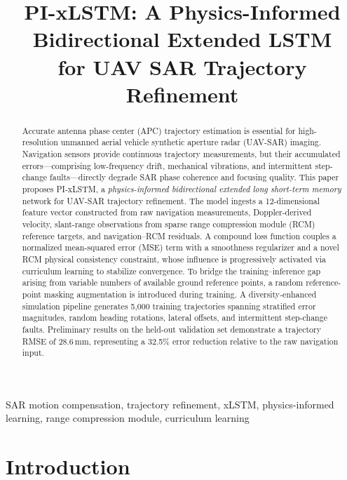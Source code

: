 \documentclass[conference]{IEEEtran}
\title{PI-xLSTM: A Physics-Informed Bidirectional Extended LSTM\\
for UAV SAR Trajectory Refinement}
\author{
  \IEEEauthorblockN{[Author Names Anonymized for Review]}
  \IEEEauthorblockA{[Affiliation]}
}
\begin{document}
\maketitle

\begin{abstract}
Accurate antenna phase center (APC) trajectory estimation is essential for high-resolution
unmanned aerial vehicle synthetic aperture radar (UAV-SAR) imaging.
Navigation sensors provide continuous trajectory measurements,
but their accumulated errors—comprising low-frequency drift,
mechanical vibrations, and intermittent step-change faults—directly degrade
SAR phase coherence and focusing quality.
This paper proposes PI-xLSTM, a \emph{physics-informed bidirectional extended
long short-term memory} network for UAV-SAR trajectory refinement.
The model ingests a 12-dimensional feature vector constructed from raw navigation
measurements, Doppler-derived velocity, slant-range observations from sparse
range compression module (RCM) reference targets, and navigation–RCM residuals.
A compound loss function couples a normalized mean-squared error (MSE) term
with a smoothness regularizer and a novel RCM physical consistency constraint,
whose influence is progressively activated via curriculum learning to stabilize
convergence.
To bridge the training–inference gap arising from variable numbers of
available ground reference points, a random reference-point masking augmentation
is introduced during training.
A diversity-enhanced simulation pipeline generates 5{,}000 training trajectories
spanning stratified error magnitudes, random heading rotations,
lateral offsets, and intermittent step-change faults.
Preliminary results on the held-out validation set demonstrate a trajectory RMSE
of 28.6\,mm, representing a 32.5\% error reduction relative to the raw navigation
input.
\end{abstract}

\begin{IEEEkeywords}
SAR motion compensation, trajectory refinement, xLSTM, physics-informed learning,
range compression module, curriculum learning
\end{IEEEkeywords}

\section{Introduction}
\label{sec:intro}
\end{document}
